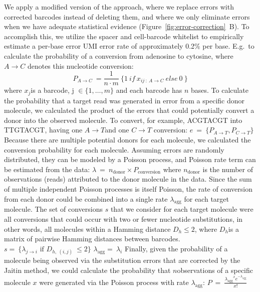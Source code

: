 We apply a modified version of the \citep{Jaitin2014} approach, where we replace errors with corrected barcodes instead of deleting them, and where we only eliminate errors when we have adequate statistical evidence (Figure~\ref{fig:error-correction}~B). 
To accomplish this, we utilize the spacer and cell-barcode whitelist to empirically estimate a per-base error UMI error rate of approximately 0.2\% per base. 
E.g.\ to calculate the probability of a conversion from adenosine to cytosine, where \(A \rightarrow C\) denotes this nucleotide conversion:
\[P_{A \rightarrow C}\  = \frac{1}{n \cdot m}\ \{ 1\ if\ x_{ij\ :\ A \rightarrow C}\ else\ 0\ \}\]
where \(x_{j}\)is a barcode, \(\text{j\ } \in \{ 1,\ldots,m\}\) and each barcode has \(n\) bases.
To calculate the probability that a target read was generated in error from a specific donor molecule, we calculated the product of the errors that could potentially convert a donor into the observed molecule. 
To convert, for example, ACGTACGT into TTGTACGT, having one \(A \rightarrow T\)and one \(C \rightarrow T\) conversion:
\(e\  = \ \{ P_{A \rightarrow T},P_{C \rightarrow T}\}\ \)
Because there are multiple potential donors for each molecule, we calculated the conversion probability for each molecule. 
Assuming errors are randomly distributed, they can be modeled by a Poisson process, and Poisson rate term can be estimated from the data:
\(\lambda\  = \ n_{\text{donor}} \times P_{\text{conversion}}\)
where \(n_{\text{donor}}\) is the number of observations (reads) attributed to the donor molecule in the data. 
Since the sum of multiple independent Poisson processes is itself Poisson, the rate of conversion from each donor could be combined into a single rate \(\lambda_{\text{agg}}\) for each target molecule. 
The set of conversions \(s\) that we consider for each target molecule were all conversions that could occur with two or fewer nucleotide substitutions, in other words, all molecules within a Hamming distance \(D_{h} \leq 2\), where \(D_{h}\)is a matrix of pairwise Hamming distances between barcodes.
\(s = \ \{\lambda_{j \rightarrow i}\text{\ if\ }D_{h,\ (i,j)}\  \leq 2\}\)
\(\lambda_{\text{agg}} = \ \lambda_{i}\)
Finally, given the probability of a molecule being observed via the substitution errors that are corrected by the Jaitin method, we could calculate the probability that \(n\)observations of a specific molecule \(x\) were generated via the Poisson process with rate \(\lambda_{\text{agg}}\):
\(P\  = \ \frac{{\lambda_{\text{agg}}}^{x}e^{- \lambda_{\text{agg}}}}{x!}\)

